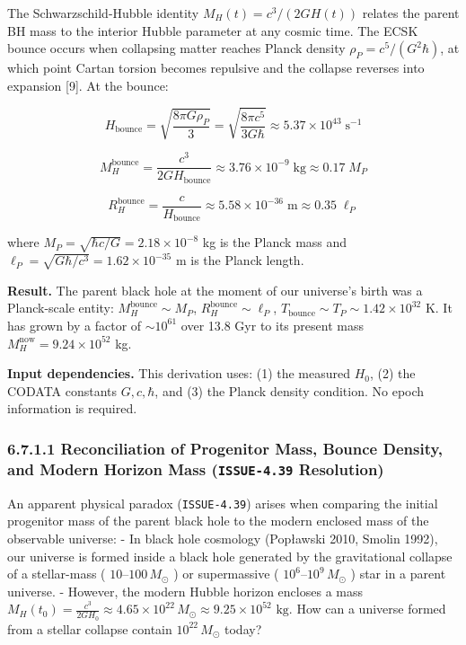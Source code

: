 \documentclass[11pt,a4paper]{article}
\theoremstyle{definition}
\theoremstyle{remark}
\begin{document}
The Schwarzschild-Hubble identity $M_H(t) = c^3/(2GH(t))$ relates the parent BH mass to the interior Hubble parameter at any cosmic time. The ECSK bounce occurs when collapsing matter reaches Planck density $\rho_P = c^5/(G^2\hbar)$, at which point Cartan torsion becomes repulsive and the collapse reverses into expansion [9]. At the bounce:


\begin{equation}
H_{\text{bounce}} = \sqrt{\frac{8\pi G \rho_P}{3}} = \sqrt{\frac{8\pi c^5}{3G\hbar}} \approx 5.37 \times 10^{43} \; \text{s}^{-1}
\end{equation}



\begin{equation}
M_H^{\text{bounce}} = \frac{c^3}{2G H_{\text{bounce}}} \approx 3.76 \times 10^{-9} \; \text{kg} \approx 0.17 \; M_P
\end{equation}



\begin{equation}
R_H^{\text{bounce}} = \frac{c}{H_{\text{bounce}}} \approx 5.58 \times 10^{-36} \; \text{m} \approx 0.35 \; \ell_P
\end{equation}


where $M_P = \sqrt{\hbar c/G} = 2.18 \times 10^{-8}$ kg is the Planck mass and $\ell_P = \sqrt{G\hbar/c^3} = 1.62 \times 10^{-35}$ m is the Planck length.

\textbf{Result.} The parent black hole at the moment of our universe's birth was a Planck-scale entity: $M_H^{\text{bounce}} \sim M_P$, $R_H^{\text{bounce}} \sim \ell_P$, $T_{\text{bounce}} \sim T_P \sim 1.42 \times 10^{32}$ K. It has grown by a factor of $\sim 10^{61}$ over 13.8 Gyr to its present mass $M_H^{\text{now}} = 9.24 \times 10^{52}$ kg.

\textbf{Input dependencies.} This derivation uses: (1) the measured $H_0$, (2) the CODATA constants $G, c, \hbar$, and (3) the Planck density condition. No epoch information is required.

\subsubsection{6.7.1.1 Reconciliation of Progenitor Mass, Bounce Density, and Modern Horizon Mass (\texttt{ISSUE-4.39} Resolution)}

An apparent physical paradox (\texttt{ISSUE-4.39}) arises when comparing the initial progenitor mass of the parent black hole to the modern enclosed mass of the observable universe:
- In black hole cosmology (Popławski 2010, Smolin 1992), our universe is formed inside a black hole generated by the gravitational collapse of a stellar-mass ( $10\text{--}100 \, M_\odot$ ) or supermassive ( $10^6\text{--}10^9 \, M_\odot$ ) star in a parent universe.
- However, the modern Hubble horizon encloses a mass $M_H(t_0) = \frac{c^3}{2 G H_0} \approx 4.65 \times 10^{22} \, M_\odot \approx 9.25 \times 10^{52}\text{ kg}$.
How can a universe formed from a stellar collapse contain $10^{22} \, M_\odot$ today?
\end{document}
